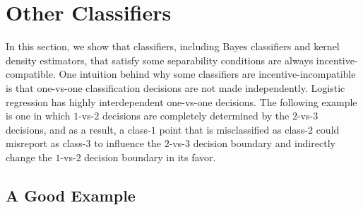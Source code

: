 \documentclass{article}
\begin{document}
\section{Other Classifiers} 
In this section, we show that classifiers, including Bayes classifiers and kernel density estimators, that satisfy some separability conditions are always incentive-compatible. One intuition behind why some classifiers are incentive-incompatible is that one-vs-one classification decisions are not made independently. Logistic regression has highly interdependent one-vs-one decisions. The following example is one in which $1$-vs-$2$ decisions are completely determined by the $2$-vs-$3$ decisions, and as a result, a class-$1$ point that is misclassified as class-$2$ could misreport as class-$3$ to influence the $2$-vs-$3$ decision boundary and indirectly change the $1$-vs-$2$ decision boundary in its favor.
\newline \newline

\subsection{A Good Example}

\begin{figure}[H] \centering {} \label{fig:1dat}
\end{figure}
\end{document}
